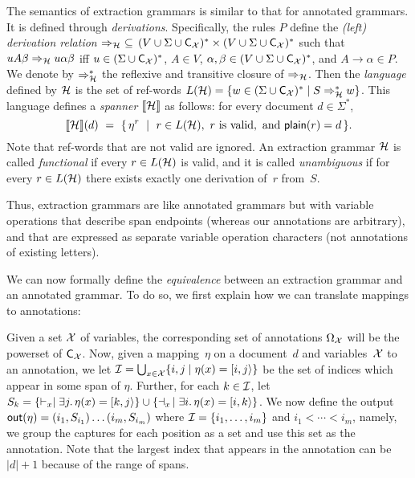 The semantics of extraction grammars is similar to that for annotated grammars.
It is defined through \emph{derivations}. Specifically, the rules $P$ define the
\emph{(left) derivation relation} $\Rightarrow_{\mathcal{H}} \ \subseteq \, (V \cup \Sigma \cup \textsf{C}_{\mathcal{X}})^* \times (V \cup \Sigma \cup  \textsf{C}_{\mathcal{X}})^*$ such that $u A \beta \Rightarrow_{\mathcal{H}} u \alpha \beta$ iff $u \in (\Sigma \cup \textsf{C}_{\mathcal{X}})^*$, $A \in V$, $\alpha, \beta \in (V \cup \Sigma \cup \textsf{C}_{\mathcal{X}})^*$, and $A \rightarrow \alpha \in P$. We denote by $\Rightarrow_{\mathcal{H}}^*$ the reflexive and transitive closure of $\Rightarrow_{\mathcal{H}}$. 
Then the \emph{language} defined by $\mathcal{H}$ is the set of ref-words $L(\mathcal{H}) = \{w \in (\Sigma \cup \textsf{C}_{\mathcal{X}})^* \mid S \Rightarrow_{\mathcal{H}}^* w\}$.
This language defines a \emph{spanner} ${\llbracket{\mathcal{H}}\rrbracket}$ as follows: for every document $d \in \Sigma^*$,
%
%
%
%
%
%
%
%
%
%
%
%
%
  \[
{\llbracket{\mathcal{H}}\rrbracket}(d) \ = \ \{ \, \eta^r \ \mid \ r \in L(\mathcal{H}), \text{ $r$ is valid}, \text{ and } \textsf{plain}(r) = d\, \}.
\]
Note that ref-words that are not valid are ignored.
An extraction grammar $\mathcal{H}$ is called \emph{functional} if every $r \in L(\mathcal{H})$ is valid, and it is called \emph{unambiguous} if for every $r \in L(\mathcal{H})$ there exists exactly one derivation of~$r$ from~$S$. 
%
%
%
%
%
%
%
%
%
%
%
%
%
%
%
%
%
%
%
%
%
%
%
%
%
%
%
%
%
%
%
%
%
%
%
%
%
%
%
%
%
%
%
%
%
%
%
%
%
%

Thus, extraction grammars are like annotated grammars but with variable
operations that
describe span endpoints
(whereas our annotations are arbitrary), and that are expressed as separate
variable operation characters (not annotations of existing letters).
%

We can now formally define the \emph{equivalence} between an extraction grammar
and an annotated grammar. To do so, we first explain how we can translate
mappings to annotations:

\begin{definition}
  \label{gram:def:outputset}
Given a set $\mathcal{X}$ of variables, the corresponding set of annotations $\Omega_{\mathcal{X}}$ will be the powerset of $\textsf{C}_{\mathcal{X}}$.
Now, given a mapping~$\eta$ on a document~$d$ and variables~$\mathcal{X}$ to an annotation, we 
%
%
let $\mathcal{I} = \bigcup_{x \in \mathcal{X}} \{i, j \mid \eta(x) = [i,j\rangle\}$ be the
set of indices which appear in some span of $\eta$.
Further, for each $k \in \mathcal{I}$, let $S_k = \{\vdash_x \mid \exists j. \, \eta(x) = [k,j\rangle\} \cup \{\dashv_x \, \mid \exists i. \, \eta(x) = [i,k\rangle\}$. We now define the output $\textsf{out}(\eta) = (i_1,S_{i_1})\ldots(i_m,S_{i_m})$ where $\mathcal{I} = \{i_1,\ldots,i_m\}$ and  $i_1 < \cdots < i_m$, namely, we group the captures for each position as a set and use this set as the annotation.
Note that the largest index that appears in the annotation can be $|d|+1$ because of the range of spans.
\end{definition}

